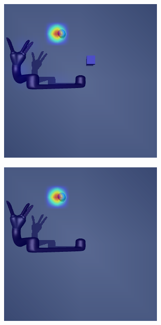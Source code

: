 \begin{figure}[h!]
\begin{subfigure}{0.24\columnwidth}
  \end{subfigure}
  \begin{subfigure}{0.24\columnwidth}
    \includegraphics[width=\linewidth]{figures/chapter6/distractor_saliency_jaco_pro_off/shape_visual_random}
  \end{subfigure}
  \begin{subfigure}{0.24\columnwidth}
    \includegraphics[width=\linewidth]{figures/chapter6/distractor_saliency_jaco_pro_on/standard_sensor_random}
  \end{subfigure}
  

\end{figure}
